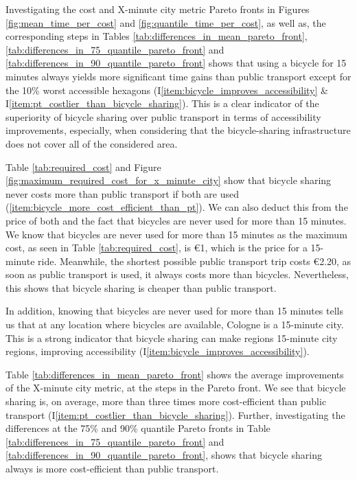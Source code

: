 Investigating the cost and X-minute city metric Pareto fronts in Figures \ref{fig:mean_time_per_cost} and \ref{fig:quantile_time_per_cost}, as well as, the corresponding steps in Tables \ref{tab:differences_in_mean_pareto_front}, \ref{tab:differences_in_75_quantile_pareto_front} and \ref{tab:differences_in_90_quantile_pareto_front} shows that using a bicycle for 15 minutes always yields more significant time gains than public transport except for the 10\% worst accessible hexagons (I\ref{item:bicycle_improves_accessibility} \& I\ref{item:pt_costlier_than_bicycle_sharing}).
This is a clear indicator of the superiority of bicycle sharing over public transport in terms of accessibility improvements, especially, when considering that the bicycle-sharing infrastructure does not cover all of the considered area.

Table \ref{tab:required_cost} and Figure \ref{fig:maximum_required_cost_for_x_minute_city} show that bicycle sharing never costs more than public transport if both are used (\ref{item:bicycle_more_cost_efficient_than_pt}).
We can also deduct this from the price of both and the fact that bicycles are never used for more than 15 minutes.
We know that bicycles are never used for more than 15 minutes as the maximum cost, as seen in Table \ref{tab:required_cost}, is \euro{1}, which is the price for a 15-minute ride.
Meanwhile, the shortest possible public transport trip costs \euro{2.20}, as soon as public transport is used, it always costs more than bicycles.
Nevertheless, this shows that bicycle sharing is cheaper than public transport. 

In addition, knowing that bicycles are never used for more than 15 minutes tells us that at any location where bicycles are available, Cologne is a 15-minute city.
This is a strong indicator that bicycle sharing can make regions 15-minute city regions, improving accessibility (I\ref{item:bicycle_improves_accessibility}).

Table \ref{tab:differences_in_mean_pareto_front} shows the average improvements of the X-minute city metric, at the steps in the Pareto front.
We see that bicycle sharing is, on average, more than three times more cost-efficient than public transport (I\ref{item:pt_costlier_than_bicycle_sharing}).
Further, investigating the differences at the 75\% and 90\% quantile Pareto fronts in Table \ref{tab:differences_in_75_quantile_pareto_front} and \ref{tab:differences_in_90_quantile_pareto_front}, shows that bicycle sharing always is more cost-efficient than public transport.

